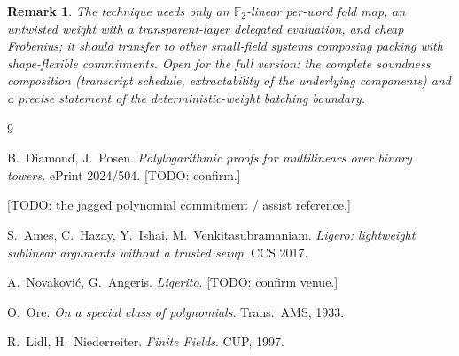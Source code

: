 \documentclass[11pt]{article}
\newcommand{\F}{\mathbb{F}}
\newcommand{\Ftwo}{\F_2}
\newtheorem{remark}[theorem]{Remark}
\begin{document}
\begin{remark}
The technique needs only an $\Ftwo$-linear per-word fold map, an
untwisted weight with a transparent-layer delegated evaluation, and
cheap Frobenius; it should transfer to other small-field systems
composing packing with shape-flexible commitments. Open for the full
version: the complete soundness composition (transcript schedule,
extractability of the underlying components) and a precise statement
of the deterministic-weight batching boundary.
\end{remark}

\begin{thebibliography}{9}\small

B.~Diamond, J.~Posen.
\emph{Polylogarithmic proofs for multilinears over binary towers}.
ePrint 2024/504. [TODO: confirm.]

[TODO: the jagged polynomial commitment / assist reference.]

S.~Ames, C.~Hazay, Y.~Ishai, M.~Venkitasubramaniam.
\emph{Ligero: lightweight sublinear arguments without a trusted setup}.
CCS 2017.

A.~Novakovi\'c, G.~Angeris. \emph{Ligerito}. [TODO: confirm venue.]

O.~Ore. \emph{On a special class of polynomials}. Trans.\ AMS, 1933.

R.~Lidl, H.~Niederreiter. \emph{Finite Fields}. CUP, 1997.

\end{thebibliography}
\end{document}
